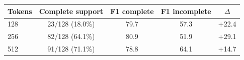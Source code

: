 \begin{tabular}{@{}lcccc@{}}
\toprule
Tokens & Complete support & F1 complete & F1 incomplete & $\Delta$ \\
\midrule
128 & 23/128 (18.0\%) & 79.7 & 57.3 & +22.4 \\
256 & 82/128 (64.1\%) & 80.9 & 51.9 & +29.1 \\
512 & 91/128 (71.1\%) & 78.8 & 64.1 & +14.7 \\
\bottomrule
\end{tabular}
